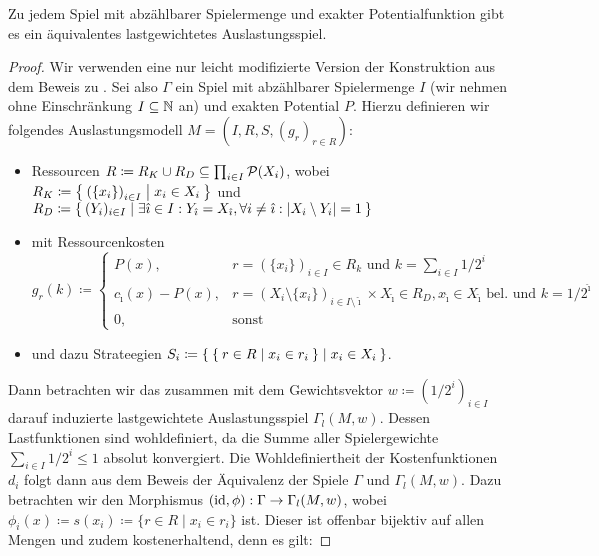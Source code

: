 \begin{satz}\label{satz:ReprAbzbarerExPotspieleDurchLastgewAusl}
	Zu jedem Spiel mit abzählbarer Spielermenge und exakter Potentialfunktion gibt es ein äquivalentes lastgewichtetes Auslastungsspiel.
\end{satz}

\begin{proof}
	Wir verwenden eine nur leicht modifizierte Version der Konstruktion aus dem Beweis zu . Sei also $\Gamma$ ein Spiel mit abzählbarer Spielermenge $I$ (wir nehmen ohne Einschränkung $I \subseteq \mathbb{N}$ an) und exakten Potential $P$. Hierzu definieren wir folgendes Auslastungsmodell $M = (I, R, S, (g_r)_{r \in R})$:
	\begin{itemize}
		\item Ressourcen $R \coloneqq R_K \cup R_D \subseteq \prod_{i \in I}\mathcal{P}(X_i)$, wobei $R_K \coloneqq \Set{\left(\{x_i\}\right)_{i \in I} | x_i \in X_i }$ und \\ $R_D \coloneqq \Set{(Y_i)_{i \in I} | \exists \hat{\imath} \in I: Y_{\hat{\imath}} = X_{\hat{\imath}}, \forall i \neq \hat{\imath}: \left|X_i \setminus Y_i\right| = 1 }$
		\item mit Ressourcenkosten
		\[g_r(k) \coloneqq 
		\begin{cases}
		P(x), 					&r = \left(\{x_i\}\right)_{i \in I} \in R_k 													\text{ und } k=\sum_{i \in I} 1/2^i \\
		c_{\hat{\imath}}(x) - P(x), 	&r = \left(X_i\setminus\{x_i\}\right)_{i \in I\setminus\hat{\imath}} \times X_{\hat{\imath}} \in R_D, x_{\hat{\imath}} \in X_{\hat{\imath}} \text{ bel. und } k=1/2^{\hat{\imath}} \\
		0,						&\text{sonst}
		\end{cases}
		\]
		\item und dazu Strateegien $S_i \coloneqq \Set{ \Set{r \in R | x_i \in r_i} | x_i \in X_i }$.
	\end{itemize}
	Dann betrachten wir das zusammen mit dem Gewichtsvektor $w \coloneqq (1/2^i)_{i \in I}$ darauf induzierte lastgewichtete Auslastungsspiel $\Gamma_l(M, w)$. Dessen Lastfunktionen sind wohldefiniert, da die Summe aller Spielergewichte $\sum_{i \in I} 1/2^i \leq 1$ absolut konvergiert. Die Wohldefiniertheit der Kostenfunktionen $d_i$ folgt dann aus dem Beweis der Äquivalenz der Spiele $\Gamma$ und $\Gamma_l(M, w)$. Dazu betrachten wir den Morphismus $(\mathrm{id}, \phi): \Gamma \to \Gamma_l(M, w)$, wobei $\phi_i(x) \coloneqq s(x_i) \coloneqq \{r \in R \mid x_i \in r_i\}$ ist. Dieser ist offenbar bijektiv auf allen Mengen und zudem kostenerhaltend, denn es gilt:

\end{proof}
